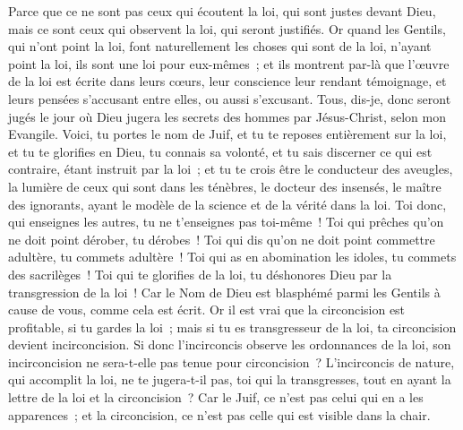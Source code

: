 \begin{multicols}{2}
Parce que ce ne sont pas ceux qui écoutent la loi, qui sont justes devant Dieu, mais ce sont ceux qui observent la loi, qui seront justifiés.
Or quand les Gentils, qui n'ont point la loi, font naturellement les choses qui sont de la loi, n'ayant point la loi, ils sont une loi pour eux-mêmes~;
et ils montrent par-là que l'œuvre de la loi est écrite dans leurs cœurs, leur conscience leur rendant témoignage, et leurs pensées s'accusant entre elles, ou aussi s'excusant.
Tous, dis-je, donc seront jugés le jour où Dieu jugera les secrets des hommes par Jésus-Christ, selon mon Evangile.
Voici, tu portes le nom de Juif, et tu te reposes entièrement sur la loi, et tu te glorifies en Dieu,
tu connais sa volonté, et tu sais discerner ce qui est contraire, étant instruit par la loi~; 
et tu te crois être le conducteur des aveugles, la lumière de ceux qui sont dans les ténèbres,
le docteur des insensés, le maître des ignorants, ayant le modèle de la science et de la vérité dans la loi.
Toi donc, qui enseignes les autres, tu ne t'enseignes pas toi-même~! Toi qui prêches qu'on ne doit point dérober, tu dérobes~!
Toi qui dis qu'on ne doit point commettre adultère, tu commets adultère~! Toi qui as en abomination les idoles, tu commets des sacrilèges~!
Toi qui te glorifies de la loi, tu déshonores Dieu par la transgression de la loi~!
Car le Nom de Dieu est blasphémé parmi les Gentils à cause de vous, comme cela est écrit.
Or il est vrai que la circoncision est profitable, si tu gardes la loi~; mais si tu es transgresseur de la loi, ta circoncision devient incirconcision.
Si donc l'incirconcis observe les ordonnances de la loi, son incirconcision ne sera-t-elle pas tenue pour circoncision~?
L'incirconcis de nature, qui accomplit la loi, ne te jugera-t-il pas, toi qui la transgresses, tout en ayant la lettre de la loi et la circoncision~?
Car le Juif, ce n'est pas celui qui en a les apparences~; et la circoncision, ce n'est pas celle qui est visible dans la chair.

\end{multicols}
